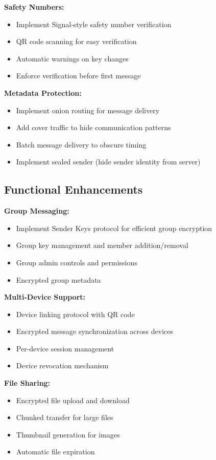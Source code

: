 \textbf{Safety Numbers:}
\begin{itemize}
    \item Implement Signal-style safety number verification
    \item QR code scanning for easy verification
    \item Automatic warnings on key changes
    \item Enforce verification before first message
\end{itemize}

\textbf{Metadata Protection:}
\begin{itemize}
    \item Implement onion routing for message delivery
    \item Add cover traffic to hide communication patterns
    \item Batch message delivery to obscure timing
    \item Implement sealed sender (hide sender identity from server)
\end{itemize}

\subsection{Functional Enhancements}

\textbf{Group Messaging:}
\begin{itemize}
    \item Implement Sender Keys protocol for efficient group encryption
    \item Group key management and member addition/removal
    \item Group admin controls and permissions
    \item Encrypted group metadata
\end{itemize}

\textbf{Multi-Device Support:}
\begin{itemize}
    \item Device linking protocol with QR code
    \item Encrypted message synchronization across devices
    \item Per-device session management
    \item Device revocation mechanism
\end{itemize}

\textbf{File Sharing:}
\begin{itemize}
    \item Encrypted file upload and download
    \item Chunked transfer for large files
    \item Thumbnail generation for images
    \item Automatic file expiration
\end{itemize}

